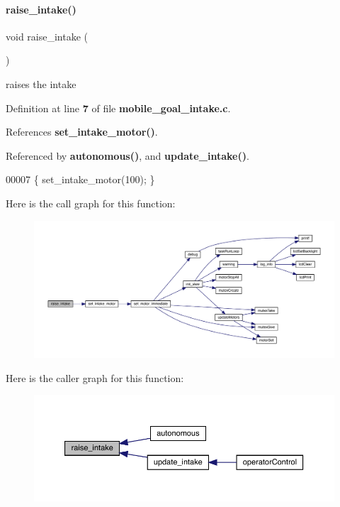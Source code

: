 \paragraph{raise\+\_\+intake()}
{\footnotesize\ttfamily void raise\+\_\+intake (\begin{DoxyParamCaption}{ }\end{DoxyParamCaption})}



raises the intake 



Definition at line \textbf{ 7} of file \textbf{ mobile\+\_\+goal\+\_\+intake.\+c}.



References \textbf{ set\+\_\+intake\+\_\+motor()}.



Referenced by \textbf{ autonomous()}, and \textbf{ update\+\_\+intake()}.


\begin{DoxyCode}
00007 \{ set_intake_motor(100); \}
\end{DoxyCode}
Here is the call graph for this function\+:
\nopagebreak
\begin{figure}[H]
\begin{center}
\leavevmode
\includegraphics[width=350pt]{mobile__goal__intake_8h_aa46a9341d1eb7b39a2ef4cc5079ee3ca_cgraph}
\end{center}
\end{figure}
Here is the caller graph for this function\+:
\nopagebreak
\begin{figure}[H]
\begin{center}
\leavevmode
\includegraphics[width=350pt]{mobile__goal__intake_8h_aa46a9341d1eb7b39a2ef4cc5079ee3ca_icgraph}
\end{center}
\end{figure}
\mbox{\label{mobile__goal__intake_8h_ab31e12bb0fa46c77906a048666b699d5}} 
